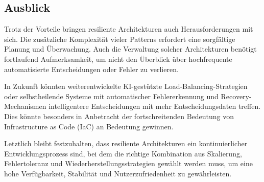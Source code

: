 \subsection{Ausblick}

Trotz der Vorteile bringen resiliente Architekturen auch Herausforderungen mit sich. Die zusätzliche Komplexität vieler Patterns erfordert eine sorgfältige Planung und Überwachung. Auch die Verwaltung solcher Architekturen benötigt fortlaufend Aufmerksamkeit, um nicht den Überblick über hochfrequente automatisierte Entscheidungen oder Fehler zu verlieren.

In Zukunft könnten weiterentwickelte KI-gestützte Load-Balancing-Strategien oder selbstheilende Systeme mit automatischer Fehlererkennung und Recovery-Mechanismen intelligentere Entscheidungen mit mehr Entscheidungsdaten treffen. Dies könnte besonders in Anbetracht der fortschreitenden Bedeutung von Infrastructure as Code (IaC) an Bedeutung gewinnen.

Letztlich bleibt festzuhalten, dass resiliente Architekturen ein kontinuierlicher Entwicklungsprozess sind, bei dem die richtige Kombination aus Skalierung, Fehlertoleranz und Wiederherstellungsstrategien gewählt werden muss, um eine hohe Verfügbarkeit, Stabilität und Nutzerzufriedenheit zu gewährleisten.